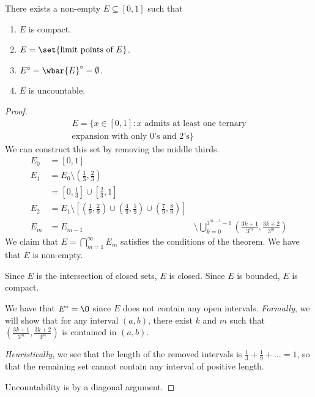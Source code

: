 \begin{theorem} \label{thm:cantor_set}
    There exists a non-empty $E \subseteq [0, 1]$ such that
    \begin{enumerate}
        \item $E$ is compact.
        \item $E = \set{\text{limit points of } E}$.
        \item $E^\circ = \wbar{E}^\circ = \emptyset$.
        \item $E$ is uncountable.
    \end{enumerate}
\end{theorem}
\begin{proof}
    \begin{align*}
        E = \{x \in [0, 1] : x \text{ admits at least one ternary} \\
        \text{expansion with only $0$'s and $2$'s}\}
    \end{align*}
    We can construct this set by removing the middle thirds.
    \begin{align*}
        E_0 &= [0, 1] \\
        E_1 &= E_0 \setminus \left(\frac13, \frac23\right) \\
           &= \left[0, \frac13\right] \cup \left[\frac23, 1\right] \\
        E_2 &= E_1 \setminus \left[\left(\frac19, \frac29\right) \cup
            \left(\frac49, \frac59\right) \cup \left(\frac79, \frac89\right)\right] \\
        E_m &= E_{m-1} &\setminus \bigcup_{k=0}^{3^{m-1} - 1}
            \left(\frac{3k + 1}{3^m}, \frac{3k + 2}{3^m}\right)
    \end{align*}
    We claim that $E = \bigcap_{m=1}^\infty E_m$ satisfies the conditions of
    the theorem.
    We have that $E$ is non-empty. %

    Since $E$ is the intersection of closed sets, $E$ is closed.
    Since $E$ is bounded, $E$ is compact.

    We have that $E^\circ = \O$ since $E$ does not contain any open
    intervals.
    \emph{Formally}, we will show that for any interval $(a, b)$, there
    exist $k$ and $m$ such that $\left(\frac{3k+1}{3^m}, \frac{3k+2}{3^m}
    \right)$ is contained in $(a, b)$. %

    \emph{Heuristically}, we see that the length of the removed intervals
    is $\frac13 + \frac19 + \dots = 1$, so that the remaining set cannot
    contain any interval of positive length.

    Uncountability is by a diagonal argument.
\end{proof}
